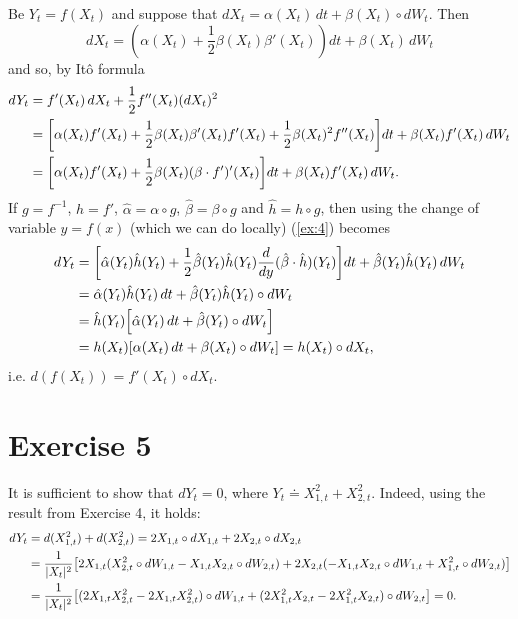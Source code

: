 \documentclass[a4paper,11pt]{article}
\theoremstyle{definition}
\theoremstyle{plain}
\theoremstyle{remark}
\DeclarePairedDelimiter{\abs}{\lvert}{\rvert}
\DeclarePairedDelimiter{\parq}{[}{]}
\begin{document}
Be $Y_t = f(X_t)$ and suppose that $dX_t = \alpha(X_t)\,dt + \beta(X_t)\circ dW_t$. Then
$$
dX_t = (\alpha(X_t)+\frac{1}{2}\beta(X_t)\beta'(X_t))dt + \beta(X_t)\,dW_t
$$
and so, by It\^o formula
\begin{align}
dY_t & = f'(X_t)\,dX_t + \frac{1}{2}f''(X_t)(dX_t)^2 \notag\\ & = \parq*{\alpha(X_t)f'(X_t) +\frac{1}{2}\beta(X_t)\beta'(X_t)f'(X_t) + \frac{1}{2}\beta(X_t)^2f''(X_t)}dt + \beta(X_t)f'(X_t)\,dW_t \notag\\ & = \parq*{\alpha(X_t)f'(X_t) +\frac{1}{2}\beta(X_t)(\beta\cdot f')'(X_t)}dt + \beta(X_t)f'(X_t)\,dW_t. \label{ex:4}
\end{align}
If $g = f^{-1}$, $h = f'$, $\hat{\alpha} = \alpha\circ g$, $\hat{\beta} = \beta\circ g$ and $\hat{h} = h\circ g$,  then using the change of variable $y=f(x)$ (which we can do locally) (\ref{ex:4}) becomes
\begin{align*}
dY_t & = \parq*{\hat{\alpha}(Y_t)\hat{h}(Y_t)+\frac{1}{2}\hat{\beta}(Y_t)\hat{h}(Y_t)\frac{d}{dy}(\hat{\beta}\cdot\hat{h})(Y_t)}dt + \hat{\beta}(Y_t)\hat{h}(Y_t)\,dW_t \\ & = \hat{\alpha}(Y_t)\hat{h}(Y_t)\,dt + \hat{\beta}(Y_t)\hat{h}(Y_t)\circ dW_t \\ & = \hat{h}(Y_t)\parq*{\hat{\alpha}(Y_t)\,dt + \hat{\beta}(Y_t)\circ dW_t} \\ & = h(X_t)\parq*{\alpha(X_t)\,dt + \beta(X_t)\circ dW_t} = h(X_t) \circ  dX_t,
\end{align*}
i.e. $d(f(X_t)) = f'(X_t)\circ dX_t$.

\section*{Exercise 5}

It is sufficient to show that $dY_t = 0$, where $Y_t \doteq X_{1,t}^2+X_{2,t}^2$. Indeed, using the result from Exercise 4, it holds:
\begin{align*}
dY_t &  = d(X_{1,t}^2) + d(X_{2,t}^2) = 2X_{1,t}\circ dX_{1,t} + 2X_{2,t}\circ dX_{2,t} \\ & = \frac{1}{\abs{X_t}^2}\parq*{2X_{1,t}(X_{2,t}^2\circ dW_{1,t}-X_{1,t}X_{2,t}\circ dW_{2,t}) + 2X_{2,t}(-X_{1,t}X_{2,t}\circ dW_{1,t} + X_{1,t}^2\circ dW_{2,t})} \\ & = \frac{1}{\abs{X_t}^2}\parq*{(2X_{1,t}X_{2,t}^2 - 2X_{1,t}X_{2,t}^2)\circ dW_{1,t} + (2X_{1,t}^2X_{2,t} - 2X_{1,t}^2X_{2,t})\circ dW_{2,t}} = 0.
\end{align*}
\end{document}

